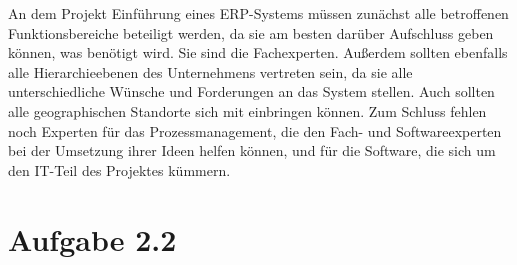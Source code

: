 \documentclass[12pt,utf8]{scrartcl}
\begin{document}
An dem Projekt Einführung eines ERP-Systems müssen zunächst alle betroffenen Funktionsbereiche beteiligt werden, da sie am besten darüber Aufschluss geben können, was benötigt wird. Sie sind die Fachexperten. Außerdem sollten ebenfalls alle Hierarchieebenen des Unternehmens vertreten sein, da sie alle unterschiedliche Wünsche und Forderungen an das System stellen. Auch sollten alle geographischen Standorte sich mit einbringen können. Zum Schluss fehlen noch Experten für das Prozessmanagement, die den Fach- und Softwareexperten bei der Umsetzung ihrer Ideen helfen können, und für die Software, die sich um den IT-Teil des Projektes kümmern\cite{Hansmann2005}.

\newpage
\section*{Aufgabe 2.2}

\newpage
\begin{flushleft}

\end{flushleft}
\end{document}
